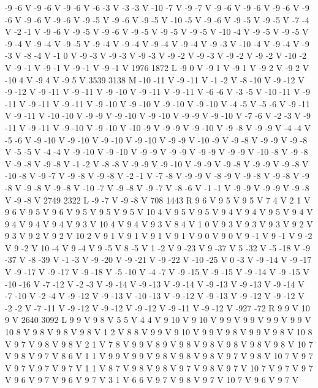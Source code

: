 {{-9 -6 V
-9 -6 V
-9 -6 V
-6 -3 V
-3 -3 V
-10 -7 V
-9 -7 V
-9 -6 V
-9 -6 V
-9 -6 V
-9 -6 V
-9 -6 V
-9 -6 V
-9 -5 V
-9 -6 V
-9 -5 V
-10 -5 V
-9 -6 V
-9 -5 V
-9 -5 V
-7 -4 V
-2 -1 V
-9 -6 V
-9 -5 V
-9 -6 V
-9 -5 V
-9 -5 V
-9 -5 V
-10 -4 V
-9 -5 V
-9 -5 V
-9 -4 V
-9 -4 V
-9 -5 V
-9 -4 V
-9 -4 V
-9 -4 V
-9 -4 V
-9 -3 V
-10 -4 V
-9 -4 V
-9 -3 V
-8 -4 V
-1 0 V
-9 -3 V
-9 -3 V
-9 -3 V
-9 -2 V
-9 -3 V
-9 -2 V
-9 -2 V
-10 -2 V
-9 -1 V
-9 -1 V
-9 -1 V
-9 -1 V
1976 1872 L
-9 0 V
-9 1 V
-9 1 V
-9 2 V
-9 2 V
-10 4 V
-9 4 V
-9 5 V
3539 3138 M
-10 -11 V
-9 -11 V
-1 -2 V
-8 -10 V
-9 -12 V
-9 -12 V
-9 -11 V
-9 -11 V
-9 -10 V
-9 -11 V
-9 -11 V
-6 -6 V
-3 -5 V
-10 -11 V
-9 -11 V
-9 -11 V
-9 -11 V
-9 -10 V
-9 -10 V
-9 -10 V
-9 -10 V
-4 -5 V
-5 -6 V
-9 -11 V
-9 -11 V
-10 -10 V
-9 -9 V
-9 -10 V
-9 -10 V
-9 -9 V
-9 -10 V
-7 -6 V
-2 -3 V
-9 -11 V
-9 -11 V
-9 -10 V
-9 -10 V
-10 -9 V
-9 -9 V
-9 -10 V
-9 -8 V
-9 -9 V
-4 -4 V
-5 -6 V
-9 -10 V
-9 -10 V
-9 -10 V
-9 -10 V
-9 -9 V
-10 -9 V
-9 -8 V
-9 -9 V
-9 -8 V
-5 -5 V
-4 -4 V
-9 -10 V
-9 -10 V
-9 -9 V
-9 -9 V
-9 -9 V
-9 -9 V
-10 -8 V
-9 -8 V
-9 -8 V
-9 -8 V
-1 -2 V
-8 -8 V
-9 -9 V
-9 -10 V
-9 -9 V
-9 -8 V
-9 -9 V
-9 -8 V
-10 -8 V
-9 -7 V
-9 -8 V
-9 -8 V
-2 -1 V
-7 -8 V
-9 -9 V
-8 -9 V
-9 -8 V
-9 -8 V
-9 -8 V
-9 -8 V
-9 -8 V
-10 -7 V
-9 -8 V
-9 -7 V
-8 -6 V
-1 -1 V
-9 -9 V
-9 -9 V
-9 -8 V
-9 -8 V
2749 2322 L
-9 -7 V
-9 -8 V
708 1443 R
9 6 V
9 5 V
9 5 V
7 4 V
2 1 V
9 6 V
9 5 V
9 6 V
9 5 V
9 5 V
9 5 V
10 4 V
9 5 V
9 5 V
9 4 V
9 4 V
9 5 V
9 4 V
9 4 V
9 4 V
9 4 V
9 3 V
10 4 V
9 4 V
9 3 V
8 4 V
1 0 V
9 3 V
9 3 V
9 3 V
9 2 V
9 3 V
9 2 V
9 2 V
10 2 V
9 1 V
9 1 V
9 1 V
9 1 V
9 0 V
9 0 V
9 -1 V
9 -1 V
9 -2 V
9 -2 V
10 -4 V
9 -4 V
9 -5 V
8 -5 V
1 -2 V
9 -23 V
9 -37 V
5 -32 V
-5 -18 V
-9 -37 V
-8 -39 V
-1 -3 V
-9 -20 V
-9 -21 V
-9 -22 V
-10 -25 V
0 -3 V
-9 -14 V
-9 -17 V
-9 -17 V
-9 -17 V
-9 -18 V
-5 -10 V
-4 -7 V
-9 -15 V
-9 -15 V
-9 -14 V
-9 -15 V
-10 -16 V
-7 -12 V
-2 -3 V
-9 -14 V
-9 -13 V
-9 -14 V
-9 -13 V
-9 -13 V
-9 -14 V
-7 -10 V
-2 -4 V
-9 -12 V
-9 -13 V
-10 -13 V
-9 -12 V
-9 -13 V
-9 -12 V
-9 -12 V
-2 -2 V
-7 -11 V
-9 -12 V
-9 -12 V
-9 -12 V
-9 -11 V
-9 -12 V
-927 -72 R
9 9 V
10 9 V
2640 3092 L
9 9 V
9 8 V
5 5 V
4 4 V
9 10 V
9 10 V
9 9 V
9 9 V
9 9 V
9 9 V
10 8 V
9 8 V
9 8 V
9 8 V
1 2 V
8 8 V
9 9 V
9 10 V
9 9 V
9 8 V
9 9 V
9 8 V
10 8 V
9 7 V
9 8 V
9 8 V
2 1 V
7 8 V
9 9 V
8 9 V
9 8 V
9 8 V
9 8 V
9 8 V
9 8 V
10 7 V
9 8 V
9 7 V
8 6 V
1 1 V
9 9 V
9 9 V
9 8 V
9 8 V
9 8 V
9 7 V
9 8 V
10 7 V
9 7 V
9 7 V
9 7 V
9 7 V
1 1 V
8 7 V
9 8 V
9 8 V
9 7 V
9 8 V
9 7 V
10 7 V
9 7 V
9 7 V
9 6 V
9 7 V
9 6 V
9 7 V
3 1 V
6 6 V
9 7 V
9 8 V
9 7 V
10 7 V
9 6 V
9 7 V
}}
